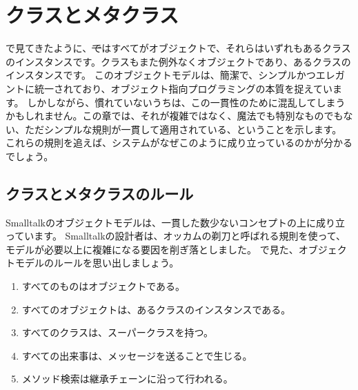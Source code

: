 \documentclass[a4paper,10pt,twoside]{book}
\begin{document}
	\renewcommand{\nnbb}[2]{} %
	\sloppy
\fi
\chapter{クラスとメタクラス}


で見てきたように、\st ではすべてがオブジェクトで、それらはいずれもあるクラスのインスタンスです。クラスもまた例外なくオブジェクトであり、あるクラスのインスタンスです。
このオブジェクトモデルは、簡潔で、シンプルかつエレガントに統一されており、オブジェクト指向プログラミングの本質を捉えています。
しかしながら、慣れていないうちは、この一貫性のために混乱してしまうかもしれません。この章では、それが複雑ではなく、魔法でも特別なものでもない、ただシンプルな規則が一貫して適用されている、ということを示します。
これらの規則を追えば、システムがなぜこのように成り立っているのかが分かるでしょう。

\section{クラスとメタクラスのルール}

Smalltalkのオブジェクトモデルは、一貫した数少ないコンセプトの上に成り立っています。
Smalltalkの設計者は、オッカムの剃刀と呼ばれる規則を使って、モデルが必要以上に複雑になる要因を削ぎ落としました。
で見た、オブジェクトモデルのルールを思い出しましょう。

\begin{enumerate}[label={\textbf{Rule \arabic{*}}.}, ref={Rule \arabic{*}}, leftmargin=*, widest=10]
\item{} %
	すべてのものはオブジェクトである。

\item{} %
	すべてのオブジェクトは、あるクラスのインスタンスである。

\item{} %
	すべてのクラスは、スーパークラスを持つ。

\item{} %
	すべての出来事は、メッセージを送ることで生じる。

\item{} %
	メソッド検索は継承チェーンに沿って行われる。

\end{enumerate}
\end{document}
